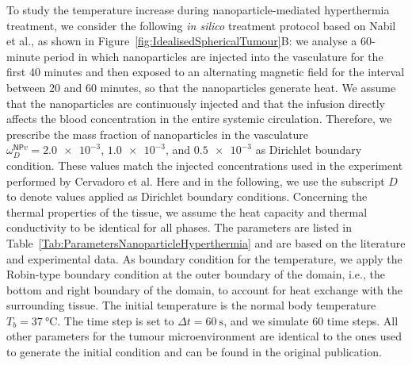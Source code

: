 \documentclass[Times1COL,AMA]{WileyNJDv5} %
\newcommand{\omegaNPvD}{\omega^{\textsf{NP}v}_D}
\begin{document}
To study the temperature increase during nanoparticle-mediated hyperthermia treatment, we consider the following \textit{in silico} treatment protocol based on Nabil et al., \cite{Nabil2015} as shown in Figure~\ref{fig:IdealisedSphericalTumour}B:
we analyse a 60-minute period in which nanoparticles are injected into the vasculature for the first 40 minutes and then exposed to an alternating magnetic field for the interval between 20 and 60 minutes, so that the nanoparticles generate heat.
We assume that the nanoparticles are continuously injected and that the infusion directly affects the blood concentration in the entire systemic circulation. \cite{Nabil2015}
Therefore, we prescribe the mass fraction of nanoparticles in the vasculature $\omegaNPvD = \num{2.0e-3}$, $\num{1.0e-3}$, and $\num{0.5e-3}$ as Dirichlet boundary condition.
These values match the injected concentrations used in the experiment performed by Cervadoro et al. \cite{Cervadoro2013}
Here and in the following, we use the subscript $D$ to denote values applied as Dirichlet boundary conditions.
Concerning the thermal properties of the tissue, we assume the heat capacity and thermal conductivity to be identical for all phases.
The parameters are listed in Table~\ref{Tab:ParametersNanoparticleHyperthermia} and are based on the literature and experimental data.
As boundary condition for the temperature, we apply the Robin-type boundary condition at the outer boundary of the domain, i.e., the bottom and right boundary of the domain, to account for heat exchange with the surrounding tissue.
The initial temperature is the normal body temperature $T_{b} = \SI{37}{\celsius}$.
The time step is set to $\Delta t = \SI{60}{\second}$, and we simulate 60 time steps.
All other parameters for the tumour microenvironment are identical to the ones used to generate the initial condition and can be found in the original publication. \cite{Wirthl2020}
\end{document}
